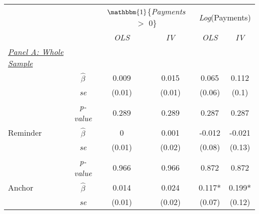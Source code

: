 \begin{tabular}{cccccc}
\tabularnewline  \midrule \midrule 
 \addlinespace 
 \addlinespace 

\multicolumn{1}{c}{ } & \multicolumn{1}{c}{ } & \multicolumn{2}{c}{$\mathbbm{1}$\{\textit{Payments} $>$ 0\}} & \multicolumn{2}{c}{\textit{Log}({Payments})} \\

\cmidrule(lr){3-4} \cmidrule(lr){5-6}
 &  & \multicolumn{1}{c}{\textit{OLS}} & \multicolumn{1}{c}{\textit{IV}} & \multicolumn{1}{c}{\textit{OLS}} & \multicolumn{1}{c}{\textit{IV}} \\

\midrule
\multicolumn{1}{l}{\underline{\textit{Panel A: Whole Sample}}} &  &  &  & &\\ 
 \addlinespace 
\multicolumn{1}{l}{Any Treatment} & \multicolumn{1}{c}{\scriptsize $\hat{\beta}$} & \multicolumn{1}{c}{0.009} & \multicolumn{1}{c}{0.015} & \multicolumn{1}{c}{0.065} & \multicolumn{1}{c}{0.112} \\
\multicolumn{1}{l}{} & \multicolumn{1}{c}{\scriptsize{\textit{se}}} & \multicolumn{1}{c}{(0.01)} & \multicolumn{1}{c}{(0.01)} & \multicolumn{1}{c}{(0.06)} & \multicolumn{1}{c}{(0.1)} \\
\multicolumn{1}{l}{} & \multicolumn{1}{c}{\scriptsize{\textit{p-value}}} & \multicolumn{1}{c}{0.289} & \multicolumn{1}{c}{0.289} & \multicolumn{1}{c}{0.287} & \multicolumn{1}{c}{0.287} \\
\multicolumn{1}{l}{Reminder} & \multicolumn{1}{c}{\scriptsize $\hat{\beta}$} & \multicolumn{1}{c}{0} & \multicolumn{1}{c}{0.001} & \multicolumn{1}{c}{-0.012} & \multicolumn{1}{c}{-0.021} \\
\multicolumn{1}{l}{} & \multicolumn{1}{c}{\scriptsize{\textit{se}}} & \multicolumn{1}{c}{(0.01)} & \multicolumn{1}{c}{(0.02)} & \multicolumn{1}{c}{(0.08)} & \multicolumn{1}{c}{(0.13)} \\
\multicolumn{1}{l}{} & \multicolumn{1}{c}{\scriptsize{\textit{p-value}}} & \multicolumn{1}{c}{0.966} & \multicolumn{1}{c}{0.966} & \multicolumn{1}{c}{0.872} & \multicolumn{1}{c}{0.872} \\
\multicolumn{1}{l}{Anchor} & \multicolumn{1}{c}{\scriptsize $\hat{\beta}$} & \multicolumn{1}{c}{0.014} & \multicolumn{1}{c}{0.024} & \multicolumn{1}{c}{0.117*} & \multicolumn{1}{c}{0.199*} \\
\multicolumn{1}{l}{} & \multicolumn{1}{c}{\scriptsize{\textit{se}}} & \multicolumn{1}{c}{(0.01)} & \multicolumn{1}{c}{(0.02)} & \multicolumn{1}{c}{(0.07)} & \multicolumn{1}{c}{(0.12)} \\

\end{tabular}
